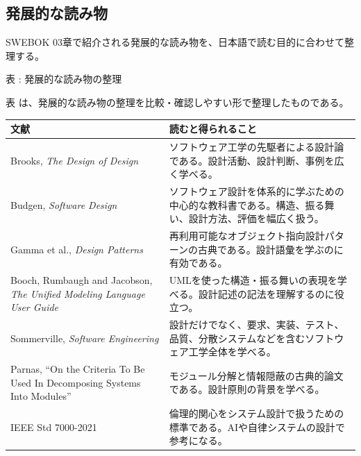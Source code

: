 \subsection{発展的な読み物}

SWEBOK 03章で紹介される発展的な読み物を、日本語で読む目的に合わせて整理する。

\par\smallskip\noindent{}\label{tab:ch03-09}表 \thetable: 発展的な読み物の整理\par\smallskip
表 \thetable は、発展的な読み物の整理を比較・確認しやすい形で整理したものである。\par\smallskip
\begin{tabularx}{\linewidth}{L{52mm}Y}
\toprule
文献 & 読むと得られること \\
\midrule
Brooks, \textit{The Design of Design} & ソフトウェア工学の先駆者による設計論である。設計活動、設計判断、事例を広く学べる。 \\
Budgen, \textit{Software Design} & ソフトウェア設計を体系的に学ぶための中心的な教科書である。構造、振る舞い、設計方法、評価を幅広く扱う。 \\
Gamma et al., \textit{Design Patterns} & 再利用可能なオブジェクト指向設計パターンの古典である。設計語彙を学ぶのに有効である。 \\
Booch, Rumbaugh and Jacobson, \textit{The Unified Modeling Language User Guide} & UMLを使った構造・振る舞いの表現を学べる。設計記述の記法を理解するのに役立つ。 \\
Sommerville, \textit{Software Engineering} & 設計だけでなく、要求、実装、テスト、品質、分散システムなどを含むソフトウェア工学全体を学べる。 \\
Parnas, “On the Criteria To Be Used In Decomposing Systems Into Modules” & モジュール分解と情報隠蔽の古典的論文である。設計原則の背景を学べる。 \\
IEEE Std 7000-2021 & 倫理的関心をシステム設計で扱うための標準である。AIや自律システムの設計で参考になる。 \\
\bottomrule
\end{tabularx}
